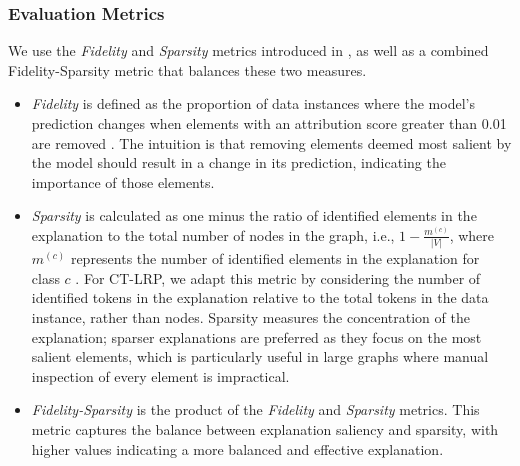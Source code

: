 
\subsubsection{Evaluation Metrics}
We use the \textit{Fidelity} and \textit{Sparsity} metrics introduced in \cite{Pope2019ExplainabilityMF}, as well as a combined Fidelity-Sparsity metric that balances these two measures.

\begin{itemize}
    \item \textit{Fidelity} is defined as the proportion of data instances where the model's prediction changes when elements with an attribution score greater than 0.01 are removed \cite{Pope2019ExplainabilityMF}. The intuition is that removing elements deemed most salient by the model should result in a change in its prediction, indicating the importance of those elements.
    \item \textit{Sparsity} is calculated as one minus the ratio of identified elements in the explanation to the total number of nodes in the graph, i.e., $1 - \frac{m^{(c)}}{|V|}$, where $m^{(c)}$ represents the number of identified elements in the explanation for class $c$ \cite{Pope2019ExplainabilityMF}. For CT-LRP, we adapt this metric by considering the number of identified tokens in the explanation relative to the total tokens in the data instance, rather than nodes. Sparsity measures the concentration of the explanation; sparser explanations are preferred as they focus on the most salient elements, which is particularly useful in large graphs where manual inspection of every element is impractical.
    \item \textit{Fidelity-Sparsity} is the product of the \textit{Fidelity} and \textit{Sparsity} metrics. This metric captures the balance between explanation saliency and sparsity, with higher values indicating a more balanced and effective explanation.
\end{itemize}


